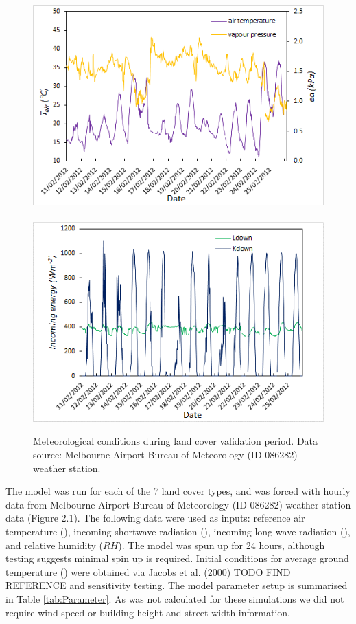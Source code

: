 \documentclass[final,3p,times,authoryear]{elsarticle}
\begin{document}
\begin{figure}[!htbp]
\includegraphics[trim=0mm 0mm 0mm 0mm, clip,scale=0.65]{images/met1.png}
~
\includegraphics[trim=0mm 0mm 0mm 0mm, clip,scale=0.65]{images/met2.png}
 \caption{Meteorological conditions during land cover validation period. Data source: Melbourne Airport Bureau of Meteorology (ID 086282) weather station.} \label{fig:met}
\end{figure}


The model was run for each of the 7 land cover types, and was forced with hourly data from Melbourne Airport Bureau of Meteorology (ID 086282) weather station data (Figure 2.1).  The following data were used as inputs: reference air temperature (), incoming shortwave radiation (), incoming long wave radiation (), and relative humidity ($RH$). The model was spun up for 24 hours, although testing suggests minimal spin up is required. Initial conditions for average ground temperature () were obtained via Jacobs et al. (2000) TODO FIND REFERENCE and sensitivity testing. The model parameter setup is summarised in Table \ref{tab:Parameter}. As  was not calculated for these simulations we did not require wind speed or building height and street width information. 
\end{document}
